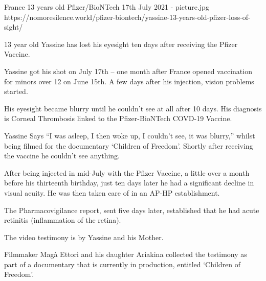{France}
{13 years old}
{Pfizer/BioNTech}
{17th July 2021}
{-}
{picture.jpg}
{https://nomoresilence.world/pfizer-biontech/yassine-13-years-old-pfizer-loss-of-sight/}
{


13 year old Yassine has lost his eyesight ten days after receiving the Pfizer Vaccine.

Yassine got his shot on July 17th – one month after France opened vaccination for minors over 12 on June 15th. A few days after his injection, vision problems started.

His eyesight became blurry until he couldn’t see at all after 10 days. His diagnosis is Corneal Thrombosis linked to the Pfizer-BioNTech COVD-19 Vaccine.

Yassine Says “I was asleep, I then woke up, I couldn’t see, it was blurry,” whilst being filmed for the documentary ‘Children of Freedom’. Shortly after receiving the vaccine he couldn’t see anything.

After being injected in mid-July with the Pfizer Vaccine, a little over a month before his thirteenth birthday, just ten days later he had a significant decline in visual acuity. He was then taken care of in an AP-HP establishment.

The Pharmacovigilance report, sent five days later, established that he had acute retinitis (inflammation of the retina).

The video testimony is by Yassine and his Mother.

Filmmaker Magà Ettori and his daughter Ariakina collected the testimony as part of a documentary that is currently in production, entitled ‘Children of Freedom’.
}
